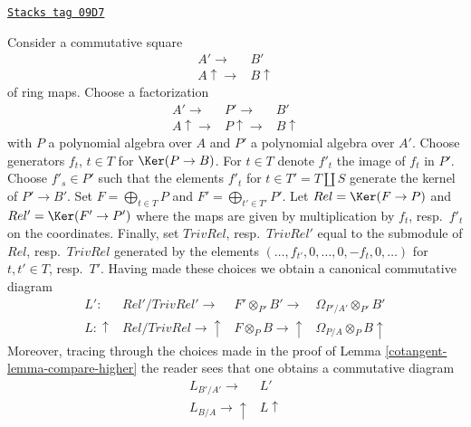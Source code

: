 \begin{remark}

\label{cotangent-remark-functoriality-lichtenbaum-schlessinger}
\href{https://stacks.math.columbia.edu/tag/09D7}{\texttt{Stacks tag 09D7}}

Consider a commutative square
$$
\begin{array}{cc}A' \longrightarrow & B' \\ A \uparrow\longrightarrow & B \uparrow\end{array}
$$
of ring maps. Choose a factorization
$$
\begin{array}{ccc}A' \longrightarrow & P' \longrightarrow & B' \\ A \uparrow\longrightarrow & P \uparrow\longrightarrow & B \uparrow\end{array}
$$
with $P$ a polynomial algebra over $A$ and $P'$ a polynomial algebra over $A'$.
Choose generators $f_t$, $t \in T$ for $\Ker(P \to B)$.
For $t \in T$ denote $f'_t$ the image of $f_t$ in $P'$.
Choose $f'_s \in P'$ such that the elements $f'_t$ for
$t \in T' = T \amalg S$ generate the kernel
of $P' \to B'$. Set $F = \bigoplus_{t \in T} P$ and
$F' = \bigoplus_{t' \in T'} P'$. Let $Rel = \Ker(F \to P)$
and $Rel' = \Ker(F' \to P')$ where the maps are given
by multiplication by $f_t$, resp.\ $f'_t$ on the coordinates.
Finally, set $TrivRel$, resp.\ $TrivRel'$ equal to the submodule
of $Rel$, resp.\ $TrivRel$ generated by the elements
$(\ldots, f_{t'}, 0, \ldots, 0, -f_t, 0, \ldots)$
for $t, t' \in T$, resp.\ $T'$. Having made these choices we obtain a
canonical commutative diagram
$$
\begin{array}{cccc}L' : & Rel'/TrivRel' \longrightarrow & F' \otimes_{P'} B' \longrightarrow & \Omega_{P'/A'} \otimes_{P'} B' \\ L : \uparrow & Rel/TrivRel \longrightarrow\uparrow & F \otimes_P B \longrightarrow\uparrow & \Omega_{P/A} \otimes_P B \uparrow\end{array}
$$
Moreover, tracing through the choices made in the proof of
Lemma \ref{cotangent-lemma-compare-higher}
the reader sees that one obtains a commutative diagram
$$
\begin{array}{cc}L_{B'/A'} \longrightarrow & L' \\ L_{B/A} \longrightarrow\uparrow & L \uparrow\end{array}
$$
\end{remark}

